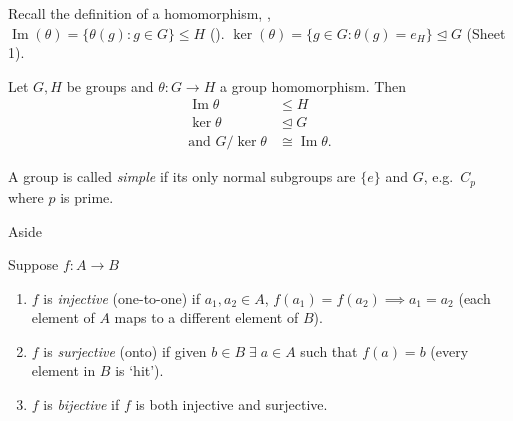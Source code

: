 \medskip

Recall the definition of a homomorphism, , \\
$\operatorname{Im}(\theta) = \{ \theta (g) : g \in G \} \leq H$ ().
$\ker(\theta) = \{ g \in G : \theta (g) = e_H \} \trianglelefteq G$ (Sheet 1).

\begin{theorem}
\protect\hypertarget{thm:six}{}\label{thm:six}
Let $G, H$ be groups and $\theta : G \to H$ a group homomorphism.
Then \begin{align*}
    \operatorname{Im} \theta &\leq H \\
    \ker \theta &\trianglelefteq G \\
    \text{and } G / \ker \theta &\cong \operatorname{Im} \theta.
\end{align*}
\end{theorem}

\begin{definition}
\protect\hypertarget{def:sixteen}{}\label{def:sixteen}
A group is called \emph{simple} if its only normal subgroups are $\{ e \}$ and $G$,
e.g.~$C_p$ where $p$ is prime.
\end{definition}

\begin{aside}{Aside}
  \begin{definition}
    Suppose $f : A \to B$
  
    \begin{enumerate}
    \def\labelenumi{\roman{enumi}.}
    \item
      $f$ is \emph{injective} (one-to-one) if $a_1, a_2 \in A$, $f(a_1) = f(a_2) \implies a_1 = a_2$ (each element of $A$ maps to a different element of $B$).
    \item
      $f$ is \emph{surjective} (onto) if given $b \in B \; \exists \; a \in A$ such that $f(a) = b$ (every element in $B$ is `hit').
    \item
      $f$ is \emph{bijective} if $f$ is both injective and surjective.
    \end{enumerate}
  \end{definition}
\end{aside} 


